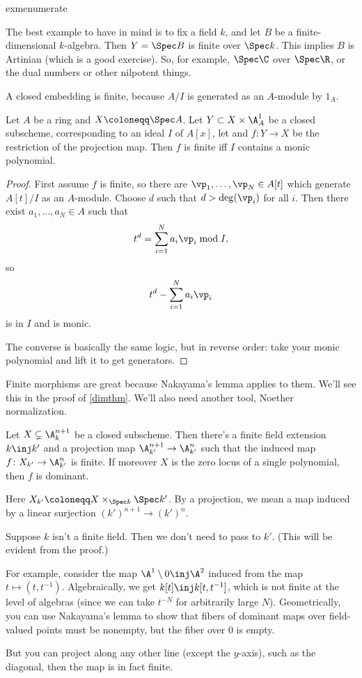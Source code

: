 \begin{comp}{exm}{enumerate}
	\item The best example to have in mind is to fix a field $k$, and let $B$ be a finite-dimensional $k$-algebra.
	Then $Y = \Spec B$ is finite over $\Spec k$. This implies $B$ is Artinian (which is a good exercise). So, for
	example, $\Spec\C$ over $\Spec\R$, or the dual numbers or other nilpotent things.
	\item A closed embedding is finite, because $A/I$ is generated as an $A$-module by $1_A$.
	\qedhere
\end{comp}
\begin{prop}
Let $A$ be a ring and $X\coloneqq\Spec A$. Let $Y\subset X\times\A^1_A$ be a closed subscheme, corresponding to an
ideal $I$ of $A[x]$, let and $f\colon Y\to X$ be the restriction of the projection map. Then $f$ is finite iff $I$
contains a monic polynomial.
\end{prop}
\begin{proof}
First assume $f$ is finite, so there are $\vp_1,\dotsc,\vp_N\in A[t]$ which generate $A[t]/I$ as an $A$-module.
Choose $d$ such that $d > \deg(\vp_i)$ for all $i$. Then there exist $a_1,\dotsc,a_N\in A$ such that
\begin{equation}
	t^d = \sum_{i=1}^N a_i\vp_i\bmod I,
\end{equation}
so
\begin{equation}
	t^d - \sum_{i=1}^N a_i\vp_i
\end{equation}
is in $I$ and is monic.

The converse is basically the same logic, but in reverse order: take your monic polynomial and lift it to get
generators.
\end{proof}
Finite morphisms are great because Nakayama's lemma applies to them. We'll see this in the proof of \cref{dimthm}.
We'll also need another tool, Noether normalization.
\begin{thm}
\label{NNorm}
Let $X\subsetneq \A_k^{n+1}$ be a closed subscheme. Then there's a finite field extension $k\inj k'$ and a
projection map $\A_{k'}^{n+1}\to\A_{k'}^n$ such that the induced map $f\colon X_{k'}\to\A_{k'}^n$ is finite. If
moreover $X$ is the zero locus of a single polynomial, then $f$ is dominant.
\end{thm}
Here $X_{k'}\coloneqq X\times_{\Spec k}\Spec k'$. By a projection, we mean a map induced by a linear surjection
$(k')^{n+1}\to (k')^n$.
\begin{rem}
Suppose $k$ isn't a finite field. Then we don't need to pass to $k'$. (This will be evident from the proof.)
\end{rem}
\begin{exm}
\label{1overx}
For example, consider the map $\A^1\setminus 0\inj\A^2$ induced from the map $t\mapsto (t,t^{-1})$.  Algebraically,
we get $k[t]\inj k[t,t^{-1}]$, which is not finite at the level of algebras (since we can take $t^{-N}$ for
arbitrarily large $N$). Geometrically, you can use Nakayama's lemma to show that fibers of dominant maps over
field-valued points must be nonempty, but the fiber over $0$ is empty.

But you can project along any other line (except the $y$-axis), such as the diagonal, then the map is in fact
finite.
\end{exm}
